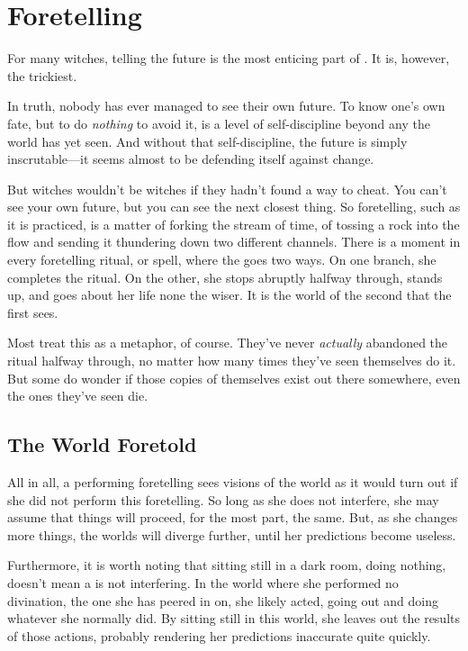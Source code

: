 \section{Foretelling}

For many witches, telling the future is the most enticing part of .
It is, however, the trickiest.

In truth, nobody has ever managed to see their own future.
To know one's own fate, but to do \emph{nothing} to avoid it, is a level of self-discipline beyond any  the world has yet seen.
And without that self-discipline, the future is simply inscrutable---it seems almost to be defending itself against change.

But witches wouldn't be witches if they hadn't found a way to cheat.
You can't see your own future, but you can see the next closest thing.
So foretelling, such as it is practiced, is a matter of forking the stream of time, of tossing a rock into the flow and sending it thundering down two different channels.
There is a moment in every foretelling ritual, or spell, where the  goes two ways.
On one branch, she completes the ritual.
On the other, she stops abruptly halfway through, stands up, and goes about her life none the wiser.
It is the world of the second  that the first  sees.

Most  treat this as a metaphor, of course.
They've never \emph{actually} abandoned the ritual halfway through, no matter how many times they've seen themselves do it.
But some do wonder if those copies of themselves exist out there somewhere, even the ones they've seen die.

\subsection{The World Foretold}

All in all, a  performing foretelling sees visions of the world as it would turn out if she did not perform this foretelling.
So long as she does not interfere, she may assume that things will proceed, for the most part, the same.
But, as she changes more things, the worlds will diverge further, until her predictions become useless.

Furthermore, it is worth noting that sitting still in a dark room, doing nothing, doesn't mean a  is not interfering.
In the world where she performed no divination, the one she has peered in on, she likely acted, going out and doing whatever she normally did.
By sitting still in this world, she leaves out the results of those actions, probably rendering her predictions inaccurate quite quickly.

